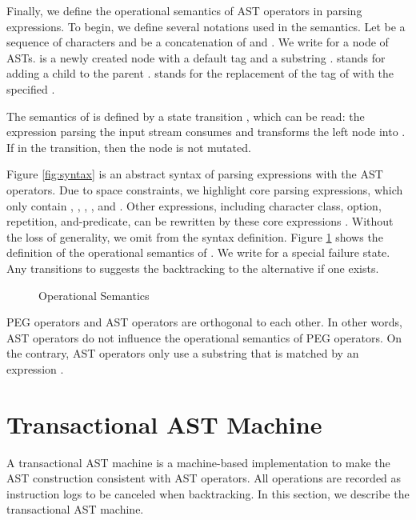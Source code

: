 \documentclass[JIP]{ipsj}
\begin{document}
Finally, we define the operational semantics of AST operators in parsing expressions. To begin, we define several notations used in the semantics. Let  be a sequence of characters and  be a concatenation of  and . We write  for a node of ASTs.  is a newly created node with a default tag  and a substring .  stands for adding a child  to the parent .  stands for the replacement of the tag of  with the specified .

The semantics of  is defined by a state transition , which can be read: the expression  parsing the input stream  consumes  and transforms the left node  into . If  in the transition, then the node is not mutated.   


Figure \ref{fig:syntax} is an abstract syntax of parsing expressions with the AST operators. Due to space constraints, we highlight core parsing expressions, which only contain , , , , and . Other expressions, including character class, option, repetition, and-predicate, can be rewritten by these core expressions \cite{POPL04_PEG}. Without the loss of generality, we omit  from the syntax definition. Figure \ref{fig:sem} shows the definition of the operational semantics of . We write  for a special failure state. Any transitions to  suggests the backtracking to the alternative if one exists. 

\begin{figure}[tb]

{\small 






















}
\caption{Operational Semantics}
\label{fig:sem}
\end{figure}

PEG operators and AST operators are orthogonal to each other. In other words, AST operators do not influence the operational semantics of PEG operators. On the contrary, AST operators only use a substring that is matched by an expression .

\section{Transactional AST Machine}

A transactional AST machine is a machine-based implementation to make the  AST construction consistent with AST operators. All operations are recorded as instruction logs to be canceled when backtracking. In this section, we describe the transactional AST machine.
\end{document}
